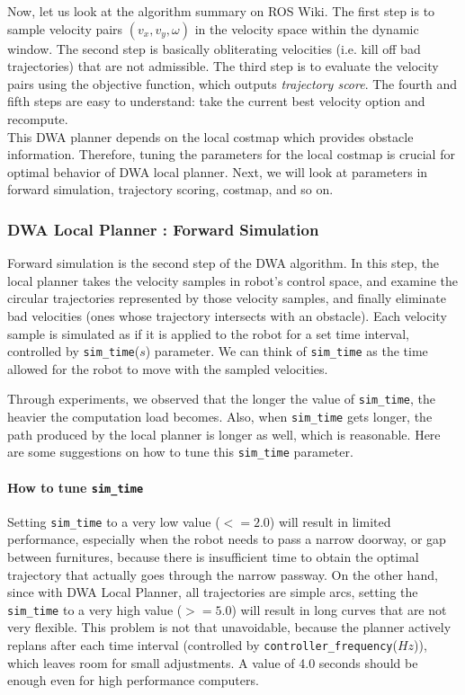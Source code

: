 \documentclass[12pt]{article}
\begin{document}
Now, let us look at the algorithm summary on ROS Wiki. The first step is to sample velocity pairs $(v_x, v_y, \omega)$ in
the velocity space within the dynamic window. The second step is basically obliterating velocities (i.e. kill off bad trajectories) that are not admissible. The third step is
to evaluate the velocity pairs using the objective function, which outputs \textit{trajectory score}. The fourth and fifth steps are easy to understand: take the current best
velocity option and recompute.\\

This DWA planner depends on the local costmap which provides obstacle information. Therefore, tuning the parameters for the local costmap is crucial for optimal behavior of DWA local planner. Next, we will look at parameters in forward simulation, trajectory scoring, costmap, and so on.

\subsubsection{DWA Local Planner : Forward Simulation}

Forward simulation is the second step of the DWA algorithm. In this step, the local planner takes the velocity samples in robot's control space, and examine the circular trajectories represented by those velocity samples, and finally
eliminate bad velocities (ones whose trajectory intersects with an obstacle). Each velocity sample is simulated as if it is applied to the robot for a set time interval, controlled by \texttt{sim\_time}($s$)
parameter. We can think of \texttt{sim\_time} as the time allowed for the robot to move with the sampled velocities.

Through experiments, we observed that the longer the value of \texttt{sim\_time}, the heavier the computation load becomes. Also, when \texttt{sim\_time} gets
longer, the path produced by the local planner is longer as well, which is reasonable. Here are some suggestions on how to tune this \texttt{sim\_time} parameter.

\paragraph{How to tune \texttt{sim\_time}}
Setting \texttt{sim\_time} to a very low value ($<= 2.0$) will result in limited performance, especially when the robot needs to pass a narrow doorway, or gap between furnitures, because there is insufficient time to obtain the optimal trajectory that actually goes through the narrow passway. On the other hand, since with DWA Local Planner, all trajectories are simple arcs,
setting the \texttt{sim\_time} to a very high value ($>= 5.0$) will result in long curves that are not very flexible. This problem is not that unavoidable,
because the planner actively replans after each time interval (controlled by \texttt{controller\_frequency}($Hz$)), which leaves room for small adjustments. A value of 4.0 seconds should be enough even for high performance computers.
\end{document}
